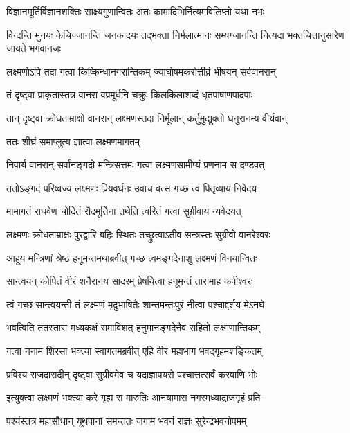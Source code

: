 \twolineshloka
{विज्ञानमूर्तिर्विज्ञानशक्तिः साक्ष्यगुणान्वितः}
{अतः कामादिभिर्नित्यमविलिप्तो यथा नभः} %

\threelineshloka
{विन्दन्ति मुनयः केचिज्जानन्ति जनकादयः}
{तद्भक्ता निर्मलात्मानः सम्यग्जानन्ति नित्यदा}
{भक्तचित्तानुसारेण जायते भगवानजः} %

\twolineshloka
{लक्ष्मणोऽपि तदा गत्वा किष्किन्धानगरान्तिकम्}
{ज्याघोषमकरोत्तीव्रं भीषयन् सर्ववानरान्} %

\twolineshloka
{तं दृष्ट्वा प्राकृतास्तत्र वानरा वप्रमूर्धनि}
{चक्रुः किलकिलाशब्दं धृतपाषाणपादपाः} %

\twolineshloka
{तान् दृष्ट्वा क्रोधताम्राक्षो वानरान् लक्ष्मणस्तदा}
{निर्मूलान् कर्तुमुद्युक्तो धनुरानम्य वीर्यवान्} %

\onelineshloka
{ततः शीघ्रं समाप्लुत्य ज्ञात्वा लक्ष्मणमागतम्} %

\twolineshloka
{निवार्य वानरान् सर्वानङ्गदो मन्त्रिसत्तमः}
{गत्वा लक्ष्मणसामीप्यं प्रणनाम स दण्डवत्} %

\twolineshloka
{ततोऽङ्गदं परिष्वज्य लक्ष्मणः प्रियवर्धनः}
{उवाच वत्स गच्छ त्वं पितृव्याय निवेदय} %

\twolineshloka
{मामागतं राघवेण चोदितं रौद्रमूर्तिना}
{तथेति त्वरितं गत्वा सुग्रीवाय न्यवेदयत्} %

\twolineshloka
{लक्ष्मणः क्रोधताम्राक्षः पुरद्वारि बहिः स्थितः}
{तच्छ्रुत्वाऽतीव सन्त्रस्तः सुग्रीवो वानरेश्वरः} %

\twolineshloka
{आहूय मन्त्रिणां श्रेष्ठं हनूमन्तमथाब्रवीत्}
{गच्छ त्वमङ्गदेनाशु लक्ष्मणं विनयान्वितः} %

\twolineshloka
{सान्त्वयन् कोपितं वीरं शनैरानय सादरम्}
{प्रेषयित्वा हनूमन्तं तारामाह कपीश्वरः} %

\twolineshloka
{त्वं गच्छ सान्त्वयन्ती तं लक्ष्मणं मृदुभाषितैः}
{शान्तमन्तःपुरं नीत्वा पश्चाद्दर्शय मेऽनघे} %

\twolineshloka
{भवत्विति ततस्तारा मध्यकक्षं समाविशत्}
{हनुमानङ्गदेनैव सहितो लक्ष्मणान्तिकम्} %

\twolineshloka
{गत्वा ननाम शिरसा भक्त्या स्वागतमब्रवीत्}
{एहि वीर महाभाग भवद्गृहमशङ्कितम्} %

\twolineshloka
{प्रविश्य राजदारादीन् दृष्ट्वा सुग्रीवमेव च}
{यदाज्ञापयसे पश्चात्तत्सर्वं करवाणि भोः} %

\twolineshloka
{इत्युक्त्वा लक्ष्मणं भक्त्या करे गृह्य स मारुतिः}
{आनयामास नगरमध्याद्राजगृहं प्रति} %

\twolineshloka
{पश्यंस्तत्र महासौधान् यूथपानां समन्ततः}
{जगाम भवनं राज्ञः सुरेन्द्रभवनोपमम्} %


